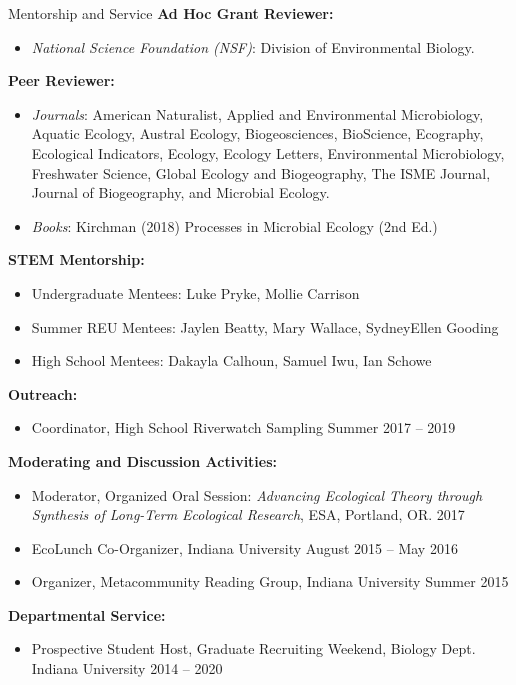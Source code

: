 \documentclass{resume} %
\begin{document}
\begin{rSection}{Mentorship and Service}
{\bf Ad Hoc Grant Reviewer:}
\begin{itemize}
  \item {\em National Science Foundation (NSF)}: Division of Environmental Biology.
\end{itemize}

{\bf Peer Reviewer:}
\begin{itemize}
  \item {\em Journals}: American Naturalist, Applied and Environmental Microbiology, Aquatic Ecology, Austral Ecology, Biogeosciences, BioScience, Ecography, Ecological Indicators, Ecology, Ecology Letters, Environmental Microbiology, Freshwater Science, Global Ecology and Biogeography, The ISME Journal, Journal of Biogeography, and Microbial Ecology.
  \item {\em Books}: Kirchman (2018) Processes in Microbial Ecology (2nd Ed.)
\end{itemize}

{\bf STEM Mentorship:}
\begin{itemize}
  \item Undergraduate Mentees: Luke Pryke, Mollie Carrison
  \item Summer REU Mentees: Jaylen Beatty, Mary Wallace, SydneyEllen Gooding
  \item High School Mentees: Dakayla Calhoun, Samuel Iwu, Ian Schowe
\end{itemize}

{\bf Outreach:}
\begin{itemize}
  \item {Coordinator, High School Riverwatch Sampling} \hfill Summer 2017 -- 2019
\end{itemize}

{\bf Moderating and Discussion Activities:}
\begin{itemize}
  \item Moderator, Organized Oral Session: {\em Advancing Ecological Theory through Synthesis of Long-Term Ecological Research}, ESA, Portland, OR. \hfill 2017
  \item EcoLunch Co-Organizer, Indiana University \hfill August 2015 -- May 2016
  \item Organizer, Metacommunity Reading Group, Indiana University \hfill Summer 2015
\end{itemize}

{\bf Departmental Service:}
\begin{itemize}
  \item Prospective Student Host, Graduate Recruiting Weekend, Biology Dept. Indiana University \hfill 2014 -- 2020
\end{itemize}

\end{rSection}
\bigskip
\end{document}
